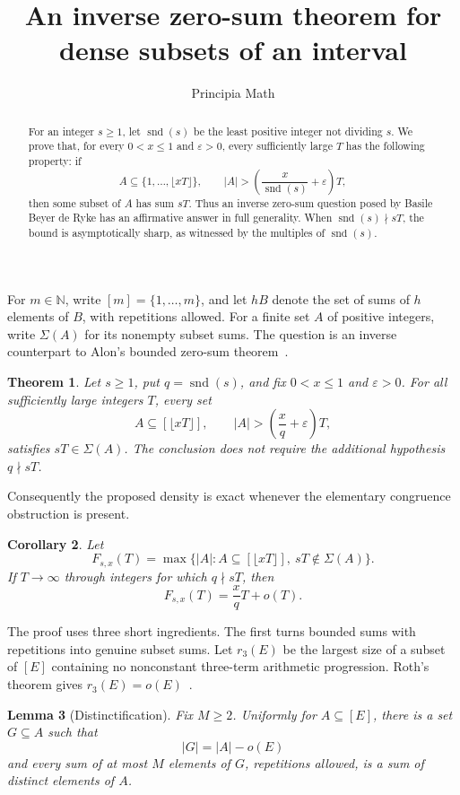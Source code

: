 \documentclass[10pt,reqno]{amsart}
\title{An inverse zero-sum theorem for dense subsets of an interval}
\author{Principia Math}
\date{}
\newtheorem{theorem}{Theorem}
\newtheorem{lemma}[theorem]{Lemma}
\newtheorem{corollary}[theorem]{Corollary}
\theoremstyle{remark}
\newcommand{\N}{\mathbb N}
\newcommand{\card}[1]{\lvert #1\rvert}
\newcommand{\snd}{\operatorname{snd}}
\begin{document}
\begin{abstract}
For an integer $s\geq1$, let $\snd(s)$ be the least positive integer not dividing $s$.
We prove that, for every $0<x\leq1$ and $\varepsilon>0$, every sufficiently large $T$ has the following property: if
\[
 A\subseteq\{1,\ldots,\lfloor xT\rfloor\},
 \qquad
 \card A>\left(\frac{x}{\snd(s)}+\varepsilon\right)T,
\]
then some subset of $A$ has sum $sT$.
Thus an inverse zero-sum question posed by Basile Beyer de Ryke has an affirmative answer in full generality.
When $\snd(s)\nmid sT$, the bound is asymptotically sharp, as witnessed by the multiples of $\snd(s)$.
\end{abstract}

\maketitle

For $m\in\N$, write $[m]=\{1,\ldots,m\}$, and let $hB$ denote the set of sums of $h$ elements of $B$, with repetitions allowed.
For a finite set $A$ of positive integers, write $\Sigma(A)$ for its nonempty subset sums.
The question is an inverse counterpart to Alon's bounded zero-sum theorem~\cite{Alon}.

\begin{theorem}\label{thm:main}
Let $s\geq1$, put $q=\snd(s)$, and fix $0<x\leq1$ and $\varepsilon>0$.
For all sufficiently large integers $T$, every set
\[
 A\subseteq[\lfloor xT\rfloor],
 \qquad
 \card A>\left(\frac{x}{q}+\varepsilon\right)T,
\]
satisfies $sT\in\Sigma(A)$.
The conclusion does not require the additional hypothesis $q\nmid sT$.
\end{theorem}

Consequently the proposed density is exact whenever the elementary congruence obstruction is present.

\begin{corollary}\label{cor:sharp}
Let
\[
 F_{s,x}(T)=\max\bigl\{\card A:A\subseteq[\lfloor xT\rfloor],\ sT\notin\Sigma(A)\bigr\}.
\]
If $T\to\infty$ through integers for which $q\nmid sT$, then
\[
 F_{s,x}(T)=\frac{x}{q}T+o(T).
\]
\end{corollary}

The proof uses three short ingredients.  The first turns bounded sums with repetitions into genuine subset sums.  Let $r_3(E)$ be the largest size of a subset of $[E]$ containing no nonconstant three-term arithmetic progression.  Roth's theorem gives $r_3(E)=o(E)$~\cite{Roth}.

\begin{lemma}[Distinctification]\label{lem:distinct}
Fix $M\geq2$.  Uniformly for $A\subseteq[E]$, there is a set $G\subseteq A$ such that
\[
 \card G=\card A-o(E)
\]
and every sum of at most $M$ elements of $G$, repetitions allowed, is a sum of distinct elements of $A$.
\end{lemma}
\end{document}
